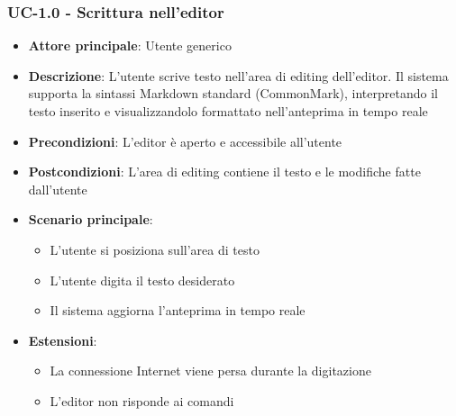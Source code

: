 \documentclass[11pt,a4paper]{article}
\begin{document}
\subsubsection{UC-1.0 - Scrittura nell'editor}
\begin{itemize}
    \item \textbf{Attore principale}: Utente generico
    \item \textbf{Descrizione}: L'utente scrive testo nell'area di editing dell'editor. Il sistema supporta la sintassi Markdown standard (CommonMark), interpretando il testo inserito e visualizzandolo formattato nell'anteprima in tempo reale
    \item \textbf{Precondizioni}: L'editor è aperto e accessibile all'utente
    \item \textbf{Postcondizioni}: L’area di editing contiene il testo e le modifiche fatte dall’utente
    \item \textbf{Scenario principale}:
        \begin{itemize}
            \item L’utente si posiziona sull’area di testo
            \item L'utente digita il testo desiderato
            \item Il sistema aggiorna l'anteprima in tempo reale
        \end{itemize}
    \item \textbf{Estensioni}:
        \begin{itemize}
            \item La connessione Internet viene persa durante la digitazione
            \item L'editor non risponde ai comandi
        \end{itemize}
\end{itemize}
\end{document}
